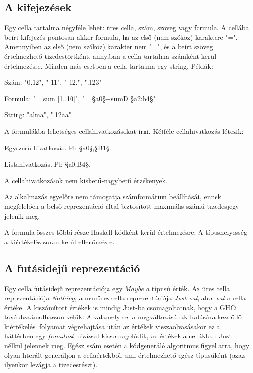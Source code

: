 \subsection{A kifejezések}

Egy cella tartalma négyféle lehet: üres cella, szám, szöveg vagy formula. A cellába beírt kifejezés pontosan akkor formula, ha az első (nem szóköz) karaktere "=". Amennyiben az első (nem szóköz) karakter nem "=", és a beírt szöveg értelmezhető tizedestörtként, annyiban a cella tartalma számként kerül értelmezésre. Minden más esetben a cella tartalma egy string. Példák:
\begin{compactenum}
	\item Szám: "0.12", "-11", "-12.", ".123"
	\item Formula: " =sum [1..10]", "= §a0§+sumD §a2:b4§"
	\item String: "alma", ".12aa"
\end{compactenum}

A formulákba lehetséges cellahivatkozásokat írni. Kétféle cellahivatkozás létezik:
\begin{compactenum}
	\item Egyszerű hivatkozás. Pl: §a0§,§B1§.
	\item Listahivatkozás. Pl: §a0:B4§.
\end{compactenum}

A cellahivatkozások nem kisbetű-nagybetű érzékenyek.

Az alkalmazás egyelőre nem támogatja számformátum beállítását, ennek megfelelően a belső reprezentáció által biztosított maximális számú tizedesjegy jelenik meg.

A formula összes többi része Haskell kódként kerül értelmezésre. A típushelyesség a kiértékelés során kerül ellenőrzésre.

\subsection{A futásidejű reprezentáció}

Egy cella futásidejű reprezentációja egy \textit{Maybe a} típusú érték. Az üres cella reprezentációja \textit{Nothing}, a nemüres cella reprezentációja \textit{Just val}, ahol \textit{val} a cella értéke. A kiszámított értékek is mindig Just-ba csomagoltatnak, hogy a GHCi továbbszámolhasson velük. A valamely cella megváltozásának hatására kezdődő kiértékelési folyamat végrehajtása után az értékek visszaolvasásakor ez a háttérben egy \textit{fromJust} hívással kicsomagolódik, az értékek a cellákban Just nélkül jelennek meg.
Egész szám esetén a kódgeneráló algoritmus figyel arra, hogy olyan literált generáljon a cellaértékből, ami értelmezhető egész típusúként (azaz ilyenkor levágja a tizedesrészt).


